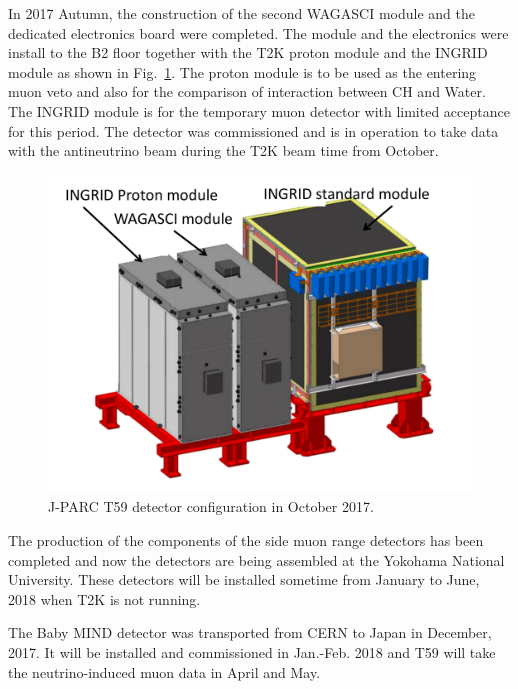 In 2017 Autumn, the construction of the second WAGASCI module and the dedicated electronics board were completed.
The module and the electronics were install to the B2 floor together with the T2K proton module and the INGRID
module as shown in Fig.~\ref{fig:det_confg_oct_dec2017}.
The proton module is to be used as the entering muon veto and also for the comparison of interaction between CH and Water.
The INGRID module is for the temporary muon detector with limited acceptance for this period.
The detector was commissioned and is in operation to take data with the antineutrino beam during the T2K beam time from October.

 \begin{figure}[tbhp]
 \begin{center}
\includegraphics[width=0.5\linewidth]{fig/t59_det_config_oct_dec_2017.pdf}
 \end{center}
 \caption{
 J-PARC T59 detector configuration in October 2017.
 }
 \label{fig:det_confg_oct_dec2017}
 \end{figure}

The production of the components of the side muon range detectors has been completed and now the detectors
are being assembled at the Yokohama National University.
These detectors will be installed sometime from January to June, 2018 when T2K is not running.

The Baby MIND detector was transported from CERN to Japan in December, 2017.
It will be installed and commissioned in Jan.-Feb. 2018 and T59 will take the neutrino-induced muon data in April and May.



